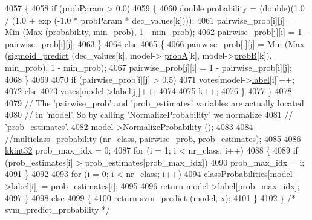 \begin{DoxyCode}
4057       \{
4058         \textcolor{keywordflow}{if}  (probParam > 0.0)
4059         \{
4060           \textcolor{keywordtype}{double} probability = (double)(1.0 / (1.0 + exp (-1.0 * probParam * dec\_values[k])));
4061           pairwise\_prob[i][j] = \hyperlink{_raster_8cpp_a6261a282d8ed27242c636ad5fb658585}{Min} (\hyperlink{namespace_k_k_b_a25e187e24c091586293725f27f007ad7}{Max} (probability, min\_prob), 1 - min\_prob);
4062           pairwise\_prob[j][i] = 1 - pairwise\_prob[i][j];
4063         \}
4064         \textcolor{keywordflow}{else}
4065         \{
4066           pairwise\_prob[i][j] = \hyperlink{_raster_8cpp_a6261a282d8ed27242c636ad5fb658585}{Min} (\hyperlink{namespace_k_k_b_a25e187e24c091586293725f27f007ad7}{Max} (\hyperlink{namespace_s_v_m289___b_f_s_a5a02bb36bfbcc78735ba18c0580b8a97}{sigmoid\_predict} (dec\_values[k], model->
      \hyperlink{struct_s_v_m289___b_f_s_1_1svm__model_a5626ef4775f7837e09dec0e2b163085b}{probA}[k], model->\hyperlink{struct_s_v_m289___b_f_s_1_1svm__model_a0cb0367a81209a239cb14d71505a1c9f}{probB}[k]), min\_prob), 1 - min\_prob);
4067           pairwise\_prob[j][i] = 1 - pairwise\_prob[i][j];
4068         \}
4069 
4070         \textcolor{keywordflow}{if}  (pairwise\_prob[i][j] > 0.5)
4071           votes[model->\hyperlink{struct_s_v_m289___b_f_s_1_1svm__model_a33bf273b5ce4cfff0b4d68210bfa7b2e}{label}[i]]++;
4072         \textcolor{keywordflow}{else}
4073           votes[model->\hyperlink{struct_s_v_m289___b_f_s_1_1svm__model_a33bf273b5ce4cfff0b4d68210bfa7b2e}{label}[j]]++;
4074 
4075         k++;
4076       \}
4077     \}
4078 
4079     \textcolor{comment}{// The 'pairwise\_prob' and 'prob\_estimates' variables are actually located}
4080     \textcolor{comment}{// in 'model'.  So by calling 'NormalizeProbability'  we normalize }
4081     \textcolor{comment}{// 'prob\_estimates'.}
4082     model->\hyperlink{struct_s_v_m289___b_f_s_1_1svm__model_a5d10aa2ae9d53ccf8f3526d36357c55d}{NormalizeProbability} (); 
4083 
4084     \textcolor{comment}{//multiclass\_probability (nr\_class, pairwise\_prob, prob\_estimates);}
4085 
4086     \hyperlink{namespace_k_k_b_a8fa4952cc84fda1de4bec1fbdd8d5b1b}{kkint32} prob\_max\_idx = 0;
4087     \textcolor{keywordflow}{for} (i = 1;  i < nr\_class;  i++)
4088     \{
4089       \textcolor{keywordflow}{if}  (prob\_estimates[i] > prob\_estimates[prob\_max\_idx])
4090         prob\_max\_idx = i;
4091     \}
4092 
4093     \textcolor{keywordflow}{for} (i = 0;  i < nr\_class;  i++)
4094       classProbabilities[model->\hyperlink{struct_s_v_m289___b_f_s_1_1svm__model_a33bf273b5ce4cfff0b4d68210bfa7b2e}{label}[i]] = prob\_estimates[i];
4095 
4096     \textcolor{keywordflow}{return}  model->\hyperlink{struct_s_v_m289___b_f_s_1_1svm__model_a33bf273b5ce4cfff0b4d68210bfa7b2e}{label}[prob\_max\_idx];
4097   \}
4098   \textcolor{keywordflow}{else} 
4099   \{
4100     \textcolor{keywordflow}{return}  \hyperlink{namespace_s_v_m233_a7f194ec68b77ae5069b5a601d3870371}{svm\_predict} (model, x);
4101   \}
4102 \}  \textcolor{comment}{/* svm\_predict\_probability */}
\end{DoxyCode}

